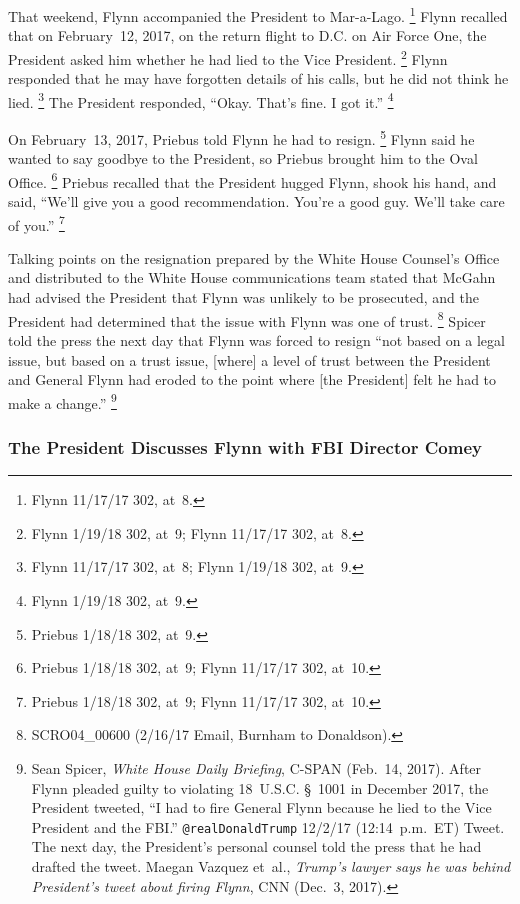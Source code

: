 That weekend, Flynn accompanied the President to Mar-a-Lago.%
\footnote{Flynn 11/17/17 302, at~8.}
Flynn recalled that on February~12, 2017, on the return flight to D.C. on Air Force One, the President asked him whether he had lied to the Vice President.%
\footnote{Flynn 1/19/18 302, at~9;
Flynn 11/17/17 302, at~8.}
Flynn responded that he may have forgotten details of his calls, but he did not think he lied.%
\footnote{Flynn 11/17/17 302, at~8;
Flynn 1/19/18 302, at~9.}
The President responded, ``Okay.
That's fine.
I got it.''%
\footnote{Flynn 1/19/18 302, at~9.}

On February~13, 2017, Priebus told Flynn he had to resign.%
\footnote{Priebus 1/18/18 302, at~9.}
Flynn said he wanted to say goodbye to the President, so Priebus brought him to the Oval Office.%
\footnote{Priebus 1/18/18 302, at~9;
Flynn 11/17/17 302, at~10.}
Priebus recalled that the President hugged Flynn, shook his hand, and said, ``We'll give you a good recommendation.
You're a good guy.
We'll take care of you.''%
\footnote{Priebus 1/18/18 302, at~9;
Flynn 11/17/17 302, at~10.}

Talking points on the resignation prepared by the White House Counsel's Office and distributed to the White House communications team stated that McGahn had advised the President that Flynn was unlikely to be prosecuted, and the President had determined that the issue with Flynn was one of trust.%
\footnote{SCRO04\_00600 (2/16/17 Email, Burnham to Donaldson).}
Spicer told the press the next day that Flynn was forced to resign ``not based on a legal issue, but based on a trust issue, [where] a level of trust between the President and General Flynn had eroded to the point where [the President] felt he had to make a change.''%
\footnote{Sean Spicer, \textit{White House Daily Briefing}, C-SPAN (Feb.~14, 2017).
After Flynn pleaded guilty to violating 18~U.S.C. \S~1001 in December 2017, the President tweeted, ``I had to fire General Flynn because he lied to the Vice President and the FBI.''
\verb+@realDonaldTrump+ 12/2/17 (12:14~p.m.~ET) Tweet.
The next day, the President's personal counsel told the press that he had drafted the tweet.
Maegan Vazquez et~al., \textit{Trump's lawyer says he was behind President's tweet about firing Flynn}, CNN (Dec.~3, 2017).}

\subsubsection{The President Discusses Flynn with FBI Director Comey}

